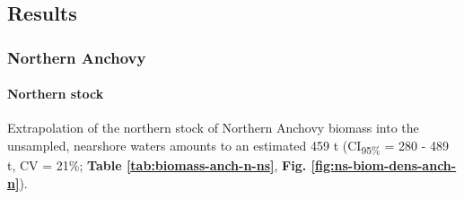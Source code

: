\documentclass[]{article}
\let\oldparagraph\paragraph
\renewcommand{\paragraph}[1]{\oldparagraph{#1}\mbox{}}
\begin{document}
\hypertarget{appendix-nearshore-biomass-results}{%
\subsection{Results}\label{appendix-nearshore-biomass-results}}

\hypertarget{appendix-nearshore-biomass-anchovy}{%
\subsubsection{Northern Anchovy}\label{appendix-nearshore-biomass-anchovy}}

\hypertarget{appendix-nearshore-biomass-anchovy-n}{%
\paragraph{Northern stock}\label{appendix-nearshore-biomass-anchovy-n}}

Extrapolation of the northern stock of Northern Anchovy biomass into the unsampled, nearshore waters amounts to an estimated 459 t (CI\textsubscript{95\%} = 280 - 489 t, CV = 21\%; \textbf{Table \ref{tab:biomass-anch-n-ns}}, \textbf{Fig. \ref{fig:ns-biom-dens-anch-n}}).



\begin{table}[!h]

\caption{\label{tab:biomass-anch-n-ns}Biomass estimates (metric tons, t) and their precision (upper and lower 95\% confidence intervals, CI\textsubscript{95\%}; standard deviation, SD; and coefficient of variation, CV) for the northern stock of Northern Anchovy (\emph{Engraulis mordax}) in the unsampled, nearshore waters. Stratum areas are nmi\textsuperscript{2}.}
\centering
{}
\end{table}
\end{document}
